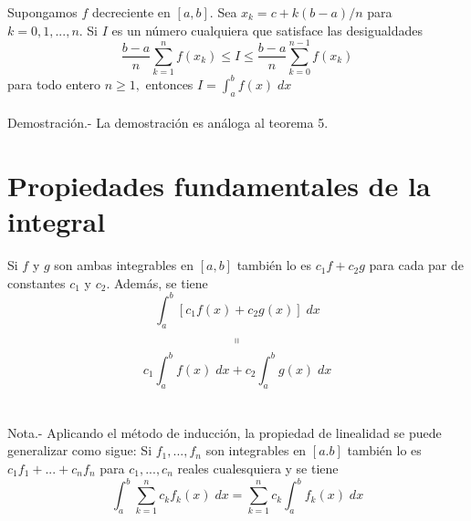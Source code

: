 \begin{multicols}{2}
\begin{teo} Supongamos $f$ decreciente en $[a,b]$. Sea $x_k=c+k(b-a)/n$ para $k=0,1,...,n$. Si $I$ es un número cualquiera que satisface las desigualdades $$\dfrac{b-a}{n} \sum\limits_{k=1}^n f(x_k) \leq I \leq \dfrac{b-a}{n} \sum\limits_{k=0}^{n-1} f(x_k)$$
    para todo entero $n\geq 1,$ entonces $I=\int_a^b f(x) \; dx$\\\\
    Demostración.-\; La demostración es análoga al teorema 5.
\end{teo}


\section*{Propiedades fundamentales de la integral}

\begin{teo} Si $f$ y $g$ son ambas integrables en $[a,b]$ también lo es $c_1f+c_2g$ para cada par de constantes $c_1$ y $c_2$. Además, se tiene
    $$\int_a^b \left[c_1 f(x) + c_2g(x)\right]\; dx$$
    $$\shortparallel$$ 
    $$c_1\int_a^b f(x) \; dx + c_2 \int_a^b g(x) \; dx$$\\\\
    Nota.- \; Aplicando el método de inducción, la propiedad de linealidad se puede generalizar como sigue: Si $f_1,...,f_n$ son integrables en $[a.b]$ también lo es $c_1f_1+...+c_nf_n$ para $c_1,...,c_n$ reales cualesquiera y se tiene $$\int_a^b \sum\limits_{k=1}^n c_kf_k(x)\; dx = \sum\limits_{k=1}^n c_k \int_a^b f_k(x)\; dx$$\\


\end{teo}
\end{multicols}
